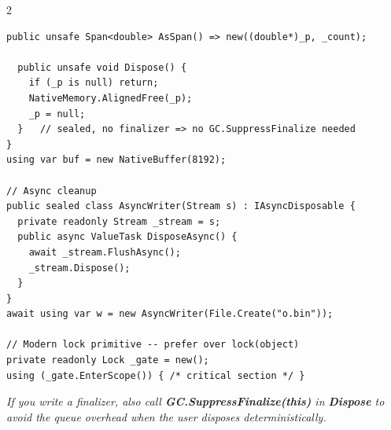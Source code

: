 \documentclass[9pt,a4paper]{extarticle}
\newenvironment{card}[3][acBlue]{%
  \begin{tcolorbox}[
    enhanced, colback=#2, colframe=bdCard,
    coltitle=black, colbacktitle=#2!70!bgHdr,
    fonttitle=\bfseries\fontsize{6.16pt}{7.48pt}\selectfont\MakeUppercase,
    title={#3},
    left=3pt, right=2pt, top=1.4pt, bottom=1.8pt,
    toptitle=1pt, bottomtitle=1pt,
    boxrule=0.4pt,
    borderline west={3pt}{0pt}{#1},
    arc=2pt, before skip=0pt, after skip=1.6mm,
    breakable, toprule at break=0pt, bottomrule at break=0pt,
  ]}{\end{tcolorbox}}
\newcommand{\code}[1]{{\ttfamily\bfseries #1}}
\newcommand{\note}[1]{\par\noindent
  \begin{minipage}{\linewidth}%
  {\fontsize{5.6pt}{6.8pt}\selectfont\itshape #1}%
  \end{minipage}\par}
\begin{document}
\begin{multicols}{2}
\begin{card}[acNavy]{bgNavy}{IDisposable, IAsyncDisposable, Lock}
\begin{lstlisting}[style=cs]
  public unsafe Span<double> AsSpan() => new((double*)_p, _count);

  public unsafe void Dispose() {
    if (_p is null) return;
    NativeMemory.AlignedFree(_p);
    _p = null;
  }   // sealed, no finalizer => no GC.SuppressFinalize needed
}
using var buf = new NativeBuffer(8192);

// Async cleanup
public sealed class AsyncWriter(Stream s) : IAsyncDisposable {
  private readonly Stream _stream = s;
  public async ValueTask DisposeAsync() {
    await _stream.FlushAsync();
    _stream.Dispose();
  }
}
await using var w = new AsyncWriter(File.Create("o.bin"));

// Modern lock primitive -- prefer over lock(object)
private readonly Lock _gate = new();
using (_gate.EnterScope()) { /* critical section */ }
\end{lstlisting}
\note{If you write a finalizer, also call \code{GC.SuppressFinalize(this)}
in \code{Dispose} to avoid the queue overhead when the user disposes
deterministically.}
\end{card}

\end{multicols}
\end{document}
